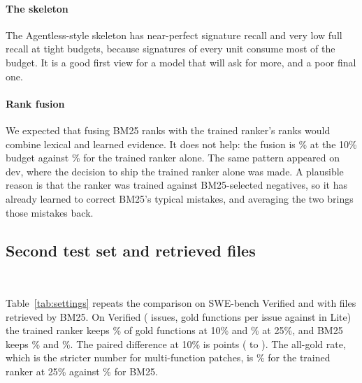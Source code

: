 \paragraph{The skeleton} The Agentless-style skeleton has near-perfect signature recall and very low full recall at tight budgets, because signatures of every unit consume most of the budget. It is a good first view for a model that will ask for more, and a poor final one.

\paragraph{Rank fusion} We expected that fusing BM25 ranks with the trained ranker's ranks would combine lexical and learned evidence. It does not help: the fusion is \% at the 10\% budget against \% for the trained ranker alone. The same pattern appeared on dev, where the decision to ship the trained ranker alone was made. A plausible reason is that the ranker was trained against BM25-selected negatives, so it has already learned to correct BM25's typical mistakes, and averaging the two brings those mistakes back.

\subsection{Second test set and retrieved files}

\begin{table}[t]
\caption{Gold-function recall (\%) at a 25\% budget for every candidate setting. Top: Lite. Bottom: Verified.}
\label{tab:settings}
\centering
\scriptsize
\setlength{\tabcolsep}{2.5pt}
\\[4pt]
\end{table}

Table~\ref{tab:settings} repeats the comparison on SWE-bench Verified and with files retrieved by BM25. On Verified ( issues,  gold functions per issue against  in Lite) the trained ranker keeps \% of gold functions at 10\% and \% at 25\%, and BM25 keeps \% and \%. The paired difference at 10\% is  points ( to ). The all-gold rate, which is the stricter number for multi-function patches, is \% for the trained ranker at 25\% against \% for BM25.

